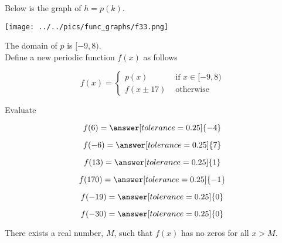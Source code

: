 \documentclass{ximera}
\author{Lee Wayand}
\begin{document}
\begin{exercise}  





Below is the graph of $h=p(k)$.  

\begin{image}
\texttt{[image: ../../pics/func\_graphs/f33.png]}
\end{image}


The domain of $p$ is $[-9, 8)$. \\


Define a new periodic function $f(x)$ as follows


\[
f(x) = 
\begin{cases}
  p(x) & \text{ if } x \in [-9, 8) \\
  f(x \pm 17) & \text{ otherwise }
\end{cases}
\]















\begin{question} 


Evaluate  

\[
f(6) = \answer[tolerance=0.25]{-4}
\]


\[
f(-6) = \answer[tolerance=0.25]{7}
\]


\[
f(13) = \answer[tolerance=0.25]{1}
\]


\[
f(170) = \answer[tolerance=0.25]{-1}
\]


\[
f(-19) = \answer[tolerance=0.25]{0}
\]


\[
f(-30) = \answer[tolerance=0.25]{0}
\]



\end{question}


















\begin{question} 


There exists a real number, $M$, such that $f(x)$ has no zeros for all $x > M$.
\begin{multipleChoice}
\end{multipleChoice}


\end{question}
\end{exercise}
\end{document}
